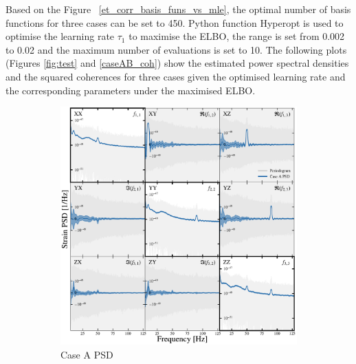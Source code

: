 \documentclass[%
 reprint,
 amsmath,amssymb,
 aps,
]{revtex4-2}
\begin{document}
Based on the Figure ~\ref {et_corr_basis_funs_vs_mle}, the optimal number of basis functions for three cases can be set to 450. Python function Hyperopt is used to optimise the learning rate $\tau_1$ to maximise the ELBO, the range is set from 0.002 to 0.02 and the maximum number of evaluations is set to 10. The following plots (Figures \ref{fig:test} and \ref{caseAB_coh}) show the estimated power spectral densities and the squared coherences for three cases given the optimised learning rate and the corresponding parameters under the maximised ELBO.
\begin{figure}[h]
\centering
\begin{subfigure}{\columnwidth}
  \centering
  \includegraphics[width=1.05\columnwidth]{caseA_psd.pdf}
  \caption{Case A PSD}
  \label{fig:caseA_psd}
\end{subfigure}
\hfill
\begin{subfigure}{\columnwidth}
  \centering

\end{subfigure}
\end{figure}
\end{document}
